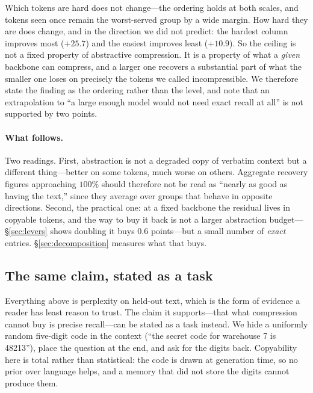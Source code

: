 \documentclass[11pt]{article}
\begin{document}
Which tokens are hard does not change---the ordering holds at both scales, and
tokens seen once remain the worst-served group by a wide margin. How hard they
are does change, and in the direction we did not predict: the hardest column
improves most ($+25.7$) and the easiest improves least ($+10.9$). So the ceiling
is not a fixed property of abstractive compression. It is a property of what a
\emph{given} backbone can compress, and a larger one recovers a substantial part
of what the smaller one loses on precisely the tokens we called incompressible.
We therefore state the finding as the ordering rather than the level, and note
that an extrapolation to ``a large enough model would not need exact recall at
all'' is not supported by two points.

\paragraph{What follows.}
Two readings. First, abstraction is not a degraded copy of verbatim context but a
different thing---better on some tokens, much worse on others. Aggregate recovery
figures approaching $100\%$ should therefore not be read as ``nearly as good as
having the text,'' since they average over groups that behave in opposite
directions. Second, the practical one: at a fixed backbone the residual lives in
copyable tokens, and the way to buy it back is not a larger abstraction
budget---\S\ref{sec:levers} shows doubling it buys $0.6$ points---but a small
number of \emph{exact} entries. \S\ref{sec:decomposition} measures what that
buys.

\subsection{The same claim, stated as a task}
\label{sec:needle}

Everything above is perplexity on held-out text, which is the form of evidence a
reader has least reason to trust. The claim it supports---that what compression
cannot buy is precise recall---can be stated as a task instead. We hide a
uniformly random five-digit code in the context (``the secret code for
warehouse 7 is 48213''), place the question at the end, and ask for the digits
back. Copyability here is total rather than statistical: the code is drawn at
generation time, so no prior over language helps, and a memory that did not
store the digits cannot produce them.
\end{document}
